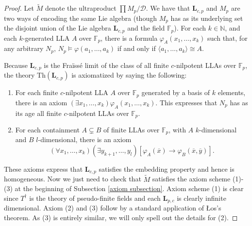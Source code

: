 \documentclass[psamsfonts]{amsart}
\theoremstyle{definition}
\theoremstyle{definition}
\theoremstyle{remark}
\numberwithin{equation}{section}
\newcommand\N{\mathbb{N}}
\renewcommand{\models}{\vDash}
\begin{document}
\begin{proof}
Let $\tilde{M}$ denote the ultraproduct $\prod M_{p}/\mathcal{D}$.  We have that $\mathbf{L}_{c,p}$ and $M_{p}$ are two ways of encoding the same Lie algebra (though $M_{p}$ has as its underlying set the disjoint union of the Lie algebra $\mathbf{L}_{c,p}$ and the field $\mathbb{F}_{p}$).  For each $k\in \N$, and each $k$-generated LLA $A$ over $\mathbb{F}_{p}$, there is a formula $\varphi_{A}(x_{1}, \ldots, x_{k})$ such that, for any arbitrary $N_{p}$, $N_{p} \models \varphi(a_{1}, \ldots, a_{k})$ if and only if $\langle a_{1}, \ldots, a_{k} \rangle \cong A$.  

Because $\mathbf{L}_{c,p}$ is the Fra\"iss\'e limit of the class of all finite $c$-nilpotent LLAs over $\mathbb{F}_{p}$, the theory $\mathrm{Th}(\mathbf{L}_{c,p})$ is axiomatized by saying the following:
\begin{enumerate}
 \item For each finite $c$-nilpotent LLA $A$ over $\mathbb{F}_{p}$ generated by a basis of $k$ elements, there is an axiom $(\exists x_{1}, \ldots, x_{k})\varphi_{A}(x_{1}, \ldots, x_{k})$.  This expresses that $N_{p}$ has as its age all finite $c$-nilpotent LLAs over $\mathbb{F}_{p}$. 
 \item For each containment $A \subsetneq B$ of finite LLAs over $\mathbb{F}_{p}$, with $A$ $k$-dimensional and $B$ $l$-dimensional, there is an axiom
 $$
 (\forall x_{1}, \ldots, x_{k})(\exists y_{k+1}, \ldots, y_{l})[\varphi_{A}(\overline{x}) \to \varphi_{B}(\overline{x}, \overline{y})].
 $$
\end{enumerate}
 These axioms express that $\mathbf{L}_{c,p}$ satisfies the embedding property and hence is homogeneous.  Now we just need to check that $\tilde{M}$ satisfies the axiom scheme (1)-(3) at the beginning of Subsection \ref{axiom subsection}.  Axiom scheme (1) is clear since $T^{\dagger}$ is the theory of pseudo-finite fields and each $\mathbf{L}_{p,c}$ is clearly infinite dimensional.  Axiom (2) and (3) follow by a standard application of {\L}os's theorem.  As (3) is entirely similar, we will only spell out the details for (2).  
 

\end{proof}
\end{document}
